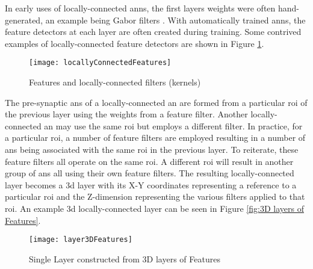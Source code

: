\iffalse With locally-connected layers, the connection weights of the pre-synaptic \acp{an} are often formed from wanting to identify particular features. \fi
In early uses of locally-connected \acp{ann}, the first layers weights were often hand-generated, an example being Gabor filters \cite{Kwolek2005}. 
With automatically trained \acp{ann}, the feature detectors at each layer are often created during training.
Some contrived examples of locally-connected feature detectors are shown in Figure \ref{fig:Features and locally-connected filters (kernels)}.
\begin{figure}[h]
\centering
    \texttt{[image: locallyConnectedFeatures]}
    \captionsetup{justification=centering, skip=5pt}
    \caption{Features and locally-connected filters (kernels)}
    \label{fig:Features and locally-connected filters (kernels)}
\end{figure}

The pre-synaptic \acp{an} of a locally-connected \ac{an} are formed from a particular \ac{roi} of the previous layer using the weights from a feature filter. 
Another locally-connected \ac{an} may use the same \ac{roi} but employs a different filter.
In practice, for a particular \ac{roi}, a number of feature filters are employed resulting in a number of \acp{an} being associated with the same \ac{roi} in the previous layer. 
To reiterate, these feature filters all operate on the same \ac{roi}.
A different \ac{roi} will result in another group of \acp{an} all using their own feature filters.
The resulting locally-connected layer becomes a \ac{3d} layer with its X-Y coordinates representing a reference to a particular \ac{roi} and the Z-dimension representing the various filters applied to that \ac{roi}.
An example \ac{3d} locally-connected layer can be seen in Figure \ref{fig:3D layers of Features}.

\iffalse
A good example of the feature filters is image recognition \acp{ann}. The lower level features generated during automatic training are often intuitive and the filters are constructed to detect small features such as lines at various angles, different curves etc..
In the general \ac{dnn} case, the trained feature detectors may not be as intuitive.
\fi

\begin{figure}[h]
\centering
    \texttt{[image: layer3DFeatures]}
    \captionsetup{justification=centering, skip=5pt}
    \caption{Single Layer constructed from 3D layers of Features}
    \label{fig:3D layers of Features}
\label{fig:Layer Features}
\end{figure}

